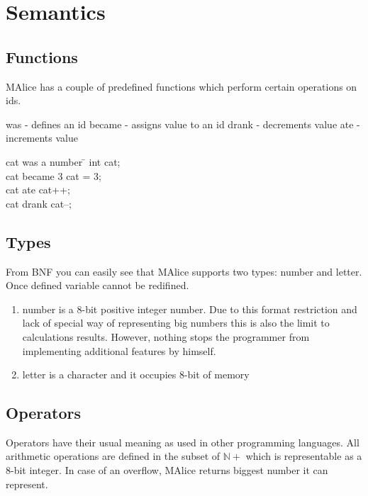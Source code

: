 \documentclass[a4wide, 11pt]{article}
\begin{document}
\section{Semantics}

\subsection{Functions}

MAlice has a couple of predefined functions which perform certain operations on ids.
\begin{tabbing}
was - defines an id
became - assigns value to an id
drank - decrements value
ate - increments value


cat was a number \=\/\/ int cat;\\
cat became 3 \> cat = 3;\\
cat ate \> cat++;\\
cat drank \> cat--;\\
\end{tabbing}

\subsection{Types}

From BNF you can easily see that MAlice supports two types: number and letter. Once defined variable cannot be redifined.

\begin{enumerate}
     \item
     number is a 8-bit positive integer number. Due to this format restriction and lack of special way of representing big numbers this is also the limit to calculations results. However, nothing stops the programmer from implementing additional features by himself.  

     \item
     letter is a character and it occupies 8-bit of memory

\end{enumerate}

\subsection{Operators}

Operators have their usual meaning as used in other programming languages. All arithmetic operations are defined in the subset of $\mathbb{N+}$ which is representable as a 8-bit integer. In case of an overflow, MAlice returns biggest number it can represent.
\end{document}
